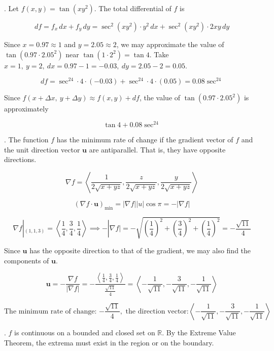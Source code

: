 \documentclass{article}
\begin{document}
\hfill

. Let $f(x,y)=\tan\left(xy^2\right)$. The total differential of $f$ is

\[df=f_x\,dx+f_y\,dy=\sec^2\left(xy^2\right)\cdot y^2\,dx+\sec^2\left(xy^2\right)\cdot2xy\,dy\]

\hfill

\noindent Since $x=0.97\approx1$ and $y=2.05\approx2$, we may approximate the value of $\tan\left(0.97\cdot2.05^2\right)$ near $\tan\left(1\cdot 2^2\right)=\tan4$. Take $x=1,\:y=2,\:dx=0.97-1=-0.03,\:dy=2.05-2=0.05$.

\[df=\sec^24\cdot4\cdot(-0.03)+\sec^24\cdot4\cdot(0.05)=0.08\sec^24\]

\hfill

\noindent Since $f(x+\Delta x,\:y+\Delta y)\approx f(x,y)+df$, the value of $\tan\left(0.97\cdot2.05^2\right)$ is approximately

\[\boxed{\tan4+0.08\sec^24}\]

\hfill

. The function $f$ has the minimum rate of change if the gradient vector of $f$ and the unit direction vector $\mathbf u$ are antiparallel. That is, they have opposite directions.

\[\nabla f=\left\langle\frac1{2\sqrt{x+yz}},\frac z{2\sqrt{x+yz}},\frac y{2\sqrt{x+yz}}\right\rangle\]

\[\left(\nabla f\cdot \mathbf u\right)_{\text{min}}=\left|\nabla f\right||u|\cos\pi=-|\nabla f|\]

\[\nabla f|_{(1,1,3)}=\left\langle\frac14,\frac34,\frac14\right\rangle\implies-|\nabla f|=-\sqrt{\left(\frac14\right)^2+\left(\frac34\right)^2+\left(\frac14\right)^2}=-\frac{\sqrt{11}}4\]

\hfill

\noindent Since $\mathbf u$ has the opposite direction to that of the gradient, we may also find the components of $\mathbf u$.

\[\mathbf{u}=-\frac{\nabla f}{|\nabla f|}=-\frac{\left\langle\frac14,\frac34,\frac14\right\rangle}{\frac{\sqrt{11}}4}=\left\langle-\frac1{\sqrt{11}},-\frac3{\sqrt{11}},-\frac1{\sqrt{11}}\right\rangle\]

\[\boxed{\text{The minimum rate of change: }{-\frac{\sqrt{11}}4},\text{ the direction vector:}\left\langle-\frac1{\sqrt{11}},-\frac3{\sqrt{11}},-\frac1{\sqrt{11}}\right\rangle}\]

\hfill

. $f$ is continuous on a bounded and closed set on $\mathbb R$. By the Extreme Value Theorem, the extrema must exist in the region or on the boundary.
\end{document}
